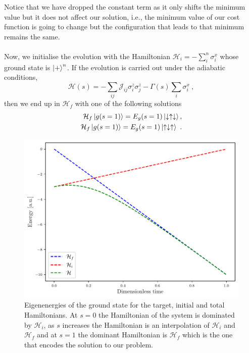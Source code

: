 Notice that we have dropped the constant term as it only shifts the minimum value but it does not affect our solution, i.e., the minimum value of our cost function is going to change but the configuration that leads to that minimum remains the same.\\\\
Now, we initialise the evolution with the Hamiltonian $\mathcal{H}_{i} = -\sum_{i}^{n}\sigma_{i}^{x}$ whose ground state is $\ket{+}^{n}$. 
If the evolution is carried out under the adiabatic conditions,
\begin{equation}
    \mathcal{H}(s) = -\sum_{ij}\mathcal{J}_{ij}\sigma_{i}^{z}\sigma_{j}^{z}  - \Gamma(s)\sum_{i}\sigma_{i}^{x}\ ,
\end{equation}
then we end up in $\mathcal{H}_{f}$ with one of the following solutions
\begin{align}
    \mathcal{H}_{f}\ket{g(s=1)} = E_{g}(s=1)\ket{\downarrow\uparrow\downarrow}, \\
    \mathcal{H}_{f}\ket{g(s=1)} = E_{g}(s=1)\ket{\uparrow\downarrow\uparrow}\ .
\end{align}
\begin{figure}[H]
\centering
\includegraphics[width=\textwidth]{Figures/Two-Heirs.pdf}
    \caption{Eigenenergies of the ground state for the target, initial and total Hamiltonians. At $s=0$ the Hamiltonian of the system is dominated by $\mathcal{H}_{i}$, as $s$ increases the Hamiltonian is an interpolation of $\mathcal{H}_{i}$ and $\mathcal{H}_{f}$ and at $s=1$ the dominant Hamiltonian is $\mathcal{H}_{f}$ which is the one that encodes the solution to our problem.}
    \label{fig:HamiltonianInterpolation}
\end{figure}
